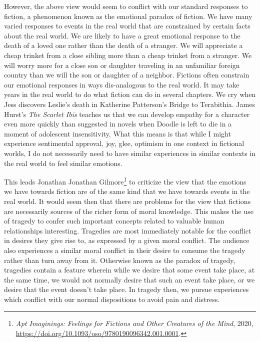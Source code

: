 \documentclass[phdthesis,12pt,final]{wuthesis}
\theoremstyle{definition}
\theoremstyle{definition}
\theoremstyle{definition}
\theoremstyle{definition}
\theoremstyle{remark}
\begin{document}
However, the above view would seem to conflict with our standard responses to fiction, a phenomenon known as the emotional paradox of fiction. We have many varied responses to events in the real world that are constrained by certain facts about the real world. We are likely to have a great emotional response to the death of a loved one rather than the death of a stranger. We will appreciate a cheap trinket from a close sibling more than a cheap trinket from a stranger. We will worry more for a close son or daughter traveling in an unfamiliar foreign country than we will the son or daughter of a neighbor. Fictions often constrain our emotional responses in ways dis-analogous to the real world. It may take years in the real world to do what fiction can do in several chapters. We cry when Jess discovers Leslie's death in Katherine Patterson's Bridge to Terabithia. James Hurst's \emph{The Scarlet Ibis} teaches us that we can develop empathy for a character even more quickly than suggested in novels when Doodle is left to die in a moment of adolescent insensitivity. What this means is that while I might experience sentimental approval, joy, glee, optimism in one context in fictional worlds, I do not necessarily need to have similar experiences in similar contexts in the real world to feel similar emotions.

This leads Jonathan Jonathan Gilmore\footnote{\emph{Apt {Imaginings}: {Feelings} for {Fictions} and {Other Creatures} of the {Mind}}, 2020, \url{https://doi.org/10.1093/oso/9780190096342.001.0001}.} to criticize the view that the emotions we have towards fiction are of the same kind that we have towards events in the real world. It would seem then that there are problems for the view that fictions are necessarily sources of the richer form of moral knowledge. This makes the use of tragedy to confer such important concepts related to valuable human relationships interesting. Tragedies are most immediately notable for the conflict in desires they give rise to, as expressed by a given moral conflict. The audience also experiences a similar moral conflict in their desire to consume the tragedy rather than turn away from it. Otherwise known as the paradox of tragedy, tragedies contain a feature wherein while we desire that some event take place, at the same time, we would not normally desire that such an event take place, or we desire that the event doesn't take place. In tragedy then, we pursue experiences which conflict with our normal dispositions to avoid pain and distress.
\end{document}
